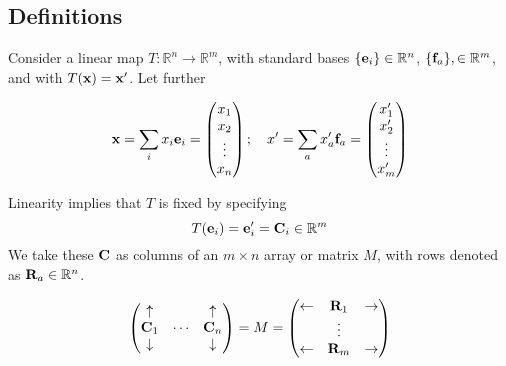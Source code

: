 \subsection{Definitions}
Consider a linear map \(T: \mathbb R^n \to \mathbb R^m\), with standard bases \(\{ \vb e_i \} \in \mathbb R^n\), \(\{ \vb f_a \}, \in \mathbb R^m\), and with \(T(\vb x) = \vb x'\).
Let further

\[
	\vb x = \sum_i x_i \vb e_i = \begin{pmatrix}
		x_1 \\ x_2 \\ \vdots \\ x_n
	\end{pmatrix};\quad x' = \sum_a x_a' \vb f_a = \begin{pmatrix}
		x_1' \\ x_2' \\ \vdots \\ x_m'
	\end{pmatrix}
\]

Linearity implies that \(T\) is fixed by specifying
\[
	T(\vb e_i) = \vb e_i' = \vb C_i \in \mathbb R^m
\]
We take these \(\vb C\) as columns of an \(m \times n\) array or matrix \(M\), with rows denoted as \(\vb R_a \in \mathbb R^n\).

\[
	\begin{pmatrix}
		\uparrow   &        & \uparrow   \\
		\vb C_1    & \cdots & \vb C_n    \\
		\downarrow &        & \downarrow
	\end{pmatrix} = M = \begin{pmatrix}
		\leftarrow & \vb R_1 & \rightarrow \\
		           & \vdots  &             \\
		\leftarrow & \vb R_m & \rightarrow
	\end{pmatrix}
\]

